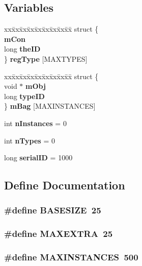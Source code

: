 \subsection*{Variables}
\begin{CompactItemize}
\item 
\begin{tabbing}
xx\=xx\=xx\=xx\=xx\=xx\=xx\=xx\=xx\=\kill
struct \{\\
 {\bf mCon}\\
\>long {\bf theID}\\
\} {\bf regType} [MAXTYPES]
\end{tabbing}
\item 
\begin{tabbing}
xx\=xx\=xx\=xx\=xx\=xx\=xx\=xx\=xx\=\kill
struct \{\\
\>void $\ast$ {\bf mObj}\\
\>long {\bf typeID}\\
\} {\bf mBag} [MAXINSTANCES]
\end{tabbing}
\item 
int {\bf n\-Instances} = 0
\item 
int {\bf n\-Types} = 0
\item 
long {\bf serial\-ID} = 1000
\end{CompactItemize}


\subsection{Define Documentation}
\subsubsection{\setlength{\rightskip}{0pt plus 5cm}\#define BASESIZE\ 25}\label{Torture_8c_a2}


\subsubsection{\setlength{\rightskip}{0pt plus 5cm}\#define MAXEXTRA\ 25}\label{Torture_8c_a3}


\subsubsection{\setlength{\rightskip}{0pt plus 5cm}\#define MAXINSTANCES\ 500}\label{Torture_8c_a1}


